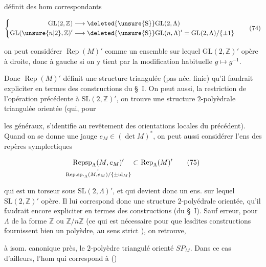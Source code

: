 définit des hom correspondants

\[
\left\{\begin{aligned}
\mathrm{GL}(2,\mathbb{Z})&\longrightarrow\deleted{\unsure{\mathrm S}}\mathrm{GL}(2,\Lambda)\\
\mathrm{GL}(\unsure{n|2},\mathbb{Z})'&\longrightarrow\deleted{\unsure{\mathrm S}}\mathrm{GL}(n,\Lambda)'=\mathrm{GL}(2,\Lambda)/\{\pm1\}
\end{aligned}\right.\tag*{(74)}
\]

on peut considérer $\operatorname{Rep}(M)'$ comme un ensemble sur lequel $\mathrm{GL}(2,\mathbb{Z})'$ opère à droite, donc à gauche si on y tient par la modification habituelle $g\longmapsto g^{-1}$.

Donc $\operatorname{Rep}(M)'$ définit une structure  triangulée (pas néc. finie) qu'il faudrait expliciter en termes des constructions du \S\ I. On peut aussi,   la restriction de l'opération précédente à $\mathrm{SL}(2,\mathbb{Z})'$, on trouve une structure $2$-polyèdrale triangulée orientée (qui, pour



les  généraux, s'identifie au revêtement des orientations locales du précédent). Quand on se donne une jauge $e_M\in(\det M)^*$, on peut aussi considérer l'ens des repères symplectiques

\[
\underset{\substack{\shortparallel\\\mathrm{Rep.sp.}_\Lambda(M,e_M)/\{\pm\mathrm{id}_M\}}}{\operatorname{Repsp}_\Lambda(M,e_M)'}\subset\operatorname{Rep}_\Lambda(M)'\tag*{(75)}
\]

qui est un torseur sous $\mathrm{SL}(2,\Lambda)'$, et qui devient donc un ens. sur lequel $\mathrm{SL}(2,\mathbb{Z})'$ opère. Il lui correspond donc une structure $2$-polyédrale orientée, qu'il faudrait encore expliciter en termes des constructions  (du \S\ I). Sauf erreur, pour $\Lambda$ de la forme $\mathbb{Z}$ ou $\mathbb{Z}/n\mathbb{Z}$ (ce qui est nécessaire pour que lesdites constructions fournissent bien un polyèdre, au sens strict ), on retrouve,


à isom. canonique près,  le $2$-polyèdre triangulé orienté $SP_M$. Dans ce cas d'ailleurs, l'hom qui correspond à ()

